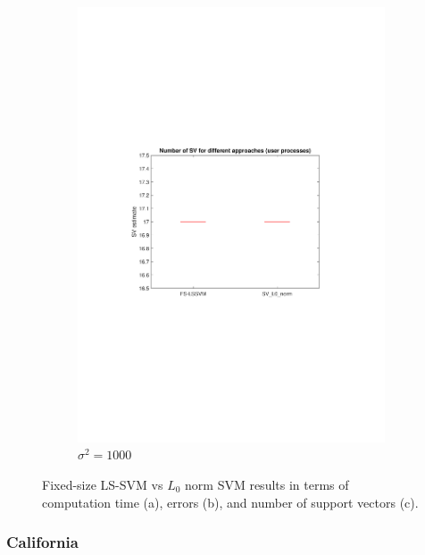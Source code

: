 \documentclass{article}
\begin{document}
\begin{figure}[h]
\begin{subfigure}[b]{0.3\textwidth}
                 \includegraphics[width=\textwidth]{Assignment 3/figures/1_3/Number_of_support_vectors.pdf}
                 \caption{$\sigma^2 = 1000$}
                 \label{fig:l0Number_supports}
             \end{subfigure}
            \caption{Fixed-size LS-SVM vs $L_0$ norm SVM results in terms of computation time (a), errors (b), and number of support vectors (c).}
        \end{figure}
        
        
        
        \subsubsection{California}
        
\end{document}
